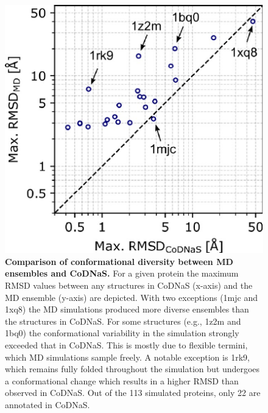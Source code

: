 \begin{figure}[H]
    \centering
    \includegraphics[width=0.7\linewidth]{constava//sup_figs/supfig5.pdf}
    \caption{\textbf{Comparison of conformational diversity between MD ensembles and CoDNaS.} For a given protein the maximum RMSD values between any structures in CoDNaS (x-axis) and the MD ensemble (y-axis) are depicted. With two exceptions (1mjc and 1xq8) the MD simulations produced more diverse ensembles than the structures in CoDNaS. For some structures (e.g., 1z2m and 1bq0) the conformational variability in the simulation strongly exceeded that in CoDNaS. This is mostly due to flexible termini, which MD simulations sample freely. A notable exception is 1rk9, which remains fully folded throughout the simulation but undergoes a conformational change which results in a higher RMSD than observed in CoDNaS. Out of the 113 simulated proteins, only 22 are annotated in CoDNaS.}
    \label{fig:sup_fig_constava:codnas}
\end{figure}

